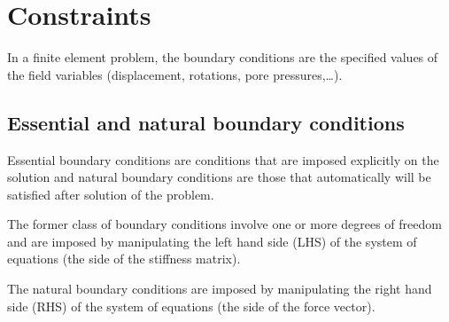 \section{Constraints}
In a finite element problem, the boundary conditions are the specified values of the field variables (displacement, rotations, pore pressures,\ldots).

\subsection{Essential and natural boundary conditions}
Essential boundary conditions are conditions that are imposed explicitly on the solution and natural boundary conditions are those that automatically will be satisfied after solution of the problem.

The former class of boundary conditions involve one or more degrees of freedom and are imposed by manipulating the left hand side (LHS) of the system of equations (the side of the stiffness matrix).

The natural boundary conditions are imposed by manipulating the right hand side (RHS) of the system of equations (the side of the force vector).




